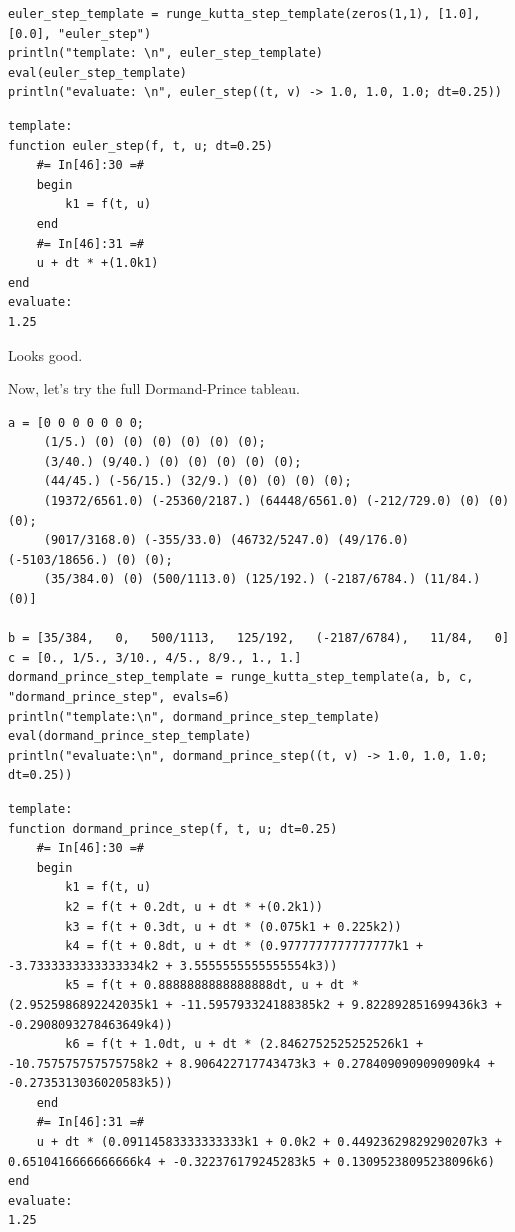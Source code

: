 \documentclass[nobib]{tufte-handout}
\begin{document}
\begin{verbatim}
euler_step_template = runge_kutta_step_template(zeros(1,1), [1.0], [0.0], "euler_step")
println("template: \n", euler_step_template)
eval(euler_step_template)
println("evaluate: \n", euler_step((t, v) -> 1.0, 1.0, 1.0; dt=0.25))
\end{verbatim}

\begin{verbatim}
template: 
function euler_step(f, t, u; dt=0.25)
    #= In[46]:30 =#
    begin
        k1 = f(t, u)
    end
    #= In[46]:31 =#
    u + dt * +(1.0k1)
end
evaluate: 
1.25
\end{verbatim}

Looks good.

Now, let's try the full Dormand-Prince tableau.

\begin{verbatim}
a = [0 0 0 0 0 0 0;
     (1/5.) (0) (0) (0) (0) (0) (0);
     (3/40.) (9/40.) (0) (0) (0) (0) (0);
     (44/45.) (-56/15.) (32/9.) (0) (0) (0) (0);
     (19372/6561.0) (-25360/2187.) (64448/6561.0) (-212/729.0) (0) (0) (0);
     (9017/3168.0) (-355/33.0) (46732/5247.0) (49/176.0) (-5103/18656.) (0) (0);
     (35/384.0) (0) (500/1113.0) (125/192.) (-2187/6784.) (11/84.) (0)]

b = [35/384,   0,   500/1113,   125/192,   (-2187/6784),   11/84,   0]
c = [0., 1/5., 3/10., 4/5., 8/9., 1., 1.]
dormand_prince_step_template = runge_kutta_step_template(a, b, c, "dormand_prince_step", evals=6)
println("template:\n", dormand_prince_step_template)
eval(dormand_prince_step_template)
println("evaluate:\n", dormand_prince_step((t, v) -> 1.0, 1.0, 1.0; dt=0.25))
\end{verbatim}

\begin{verbatim}
template:
function dormand_prince_step(f, t, u; dt=0.25)
    #= In[46]:30 =#
    begin
        k1 = f(t, u)
        k2 = f(t + 0.2dt, u + dt * +(0.2k1))
        k3 = f(t + 0.3dt, u + dt * (0.075k1 + 0.225k2))
        k4 = f(t + 0.8dt, u + dt * (0.9777777777777777k1 + -3.7333333333333334k2 + 3.5555555555555554k3))
        k5 = f(t + 0.8888888888888888dt, u + dt * (2.9525986892242035k1 + -11.595793324188385k2 + 9.822892851699436k3 + -0.2908093278463649k4))
        k6 = f(t + 1.0dt, u + dt * (2.8462752525252526k1 + -10.757575757575758k2 + 8.906422717743473k3 + 0.2784090909090909k4 + -0.2735313036020583k5))
    end
    #= In[46]:31 =#
    u + dt * (0.09114583333333333k1 + 0.0k2 + 0.44923629829290207k3 + 0.6510416666666666k4 + -0.322376179245283k5 + 0.13095238095238096k6)
end
evaluate:
1.25
\end{verbatim}
\end{document}
